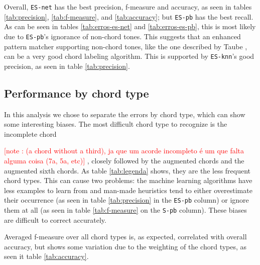 \documentclass{article}
\newcounter{notecounter}
\newcommand{\note}[1]{
  \addtocounter{notecounter}{1}
  \textcolor{red}{[note \arabic{notecounter}: #1]}
}
\begin{document}
Overall, \texttt{ES-net} has the best precision, f-measure and
accuracy, as seen in tables \ref{tab:precision}, \ref{tab:f-measure},
and \ref{tab:accuracy}; but \texttt{ES-pb} has the best recall. As can
be seen in tables \ref{tab:erros-es-net} and \ref{tab:erros-es-pb},
this is most likely due to \texttt{ES-pb}'s ignorance of non-chord
tones. This suggests that an enhanced pattern matcher supporting
non-chord tones, like the one described by Taube
\cite{taube99:automatic}, can be a very good chord labeling
algorithm. This is supported by \texttt{ES-knn}'s good precision, as
seen in table \ref{tab:precision}.


\subsection{Performance by chord type}
\label{sec:chord-perf}

In this analysis we chose to separate the errors by chord type, which
can show some interesting biases. The most difficult chord type to
recognize is the incomplete chord \note{(a chord without a third), ja
  que um acorde incompleto é um que falta alguma coisa (7a, 5a, etc)},
closely followed by the augmented chords and the augmented sixth
chords. As table \ref{tab:legenda} shows, they are the less frequent
chord types. This can cause two problems: the machine learning
algorithms have less examples to learn from and man-made heuristics
tend to either overestimate their occurrence (as seen in table
\ref{tab:precision} in the \texttt{ES-pb} column) or ignore them at
all (as seen in table \ref{tab:f-measure} on the \texttt{S-pb}
column). These biases are difficult to correct accurately.


Averaged f-measure over all chord types is, as expected, correlated
with overall accuracy, but shows some variation due to the weighting
of the chord types, as seen it table \ref{tab:accuracy}.
\end{document}
